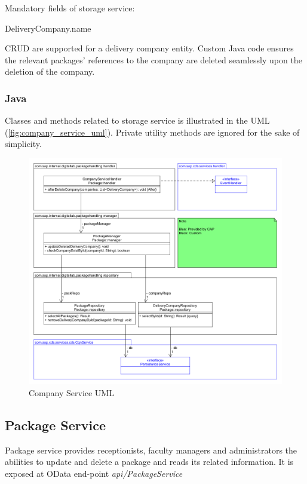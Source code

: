 \bigskip
Mandatory fields of storage service:
\begin{compactenum}
	\item DeliveryCompany.name
\end{compactenum}

\bigskip
CRUD are supported for a delivery company entity. Custom Java code ensures the relevant packages' references to the company are deleted seamlessly upon the deletion of the company.

\subsubsection{Java}

Classes and methods related to storage service is illustrated in the UML (\autoref{fig:company_service_uml}). Private utility methods are ignored for the sake of simplicity.

\begin{figure}[H]
    \centering
    \includegraphics[width=1\linewidth]{images/service_class_diagrams/company_service_class_diagram.png}
    \caption{Company Service UML}
    \label{fig:company_service_uml}
\end{figure}
\pagebreak

\subsection{Package Service}
Package service provides receptionists, faculty managers and administrators the abilities to update and delete a package and reads its related information. It is exposed at OData end-point \textit{api/PackageService} 

